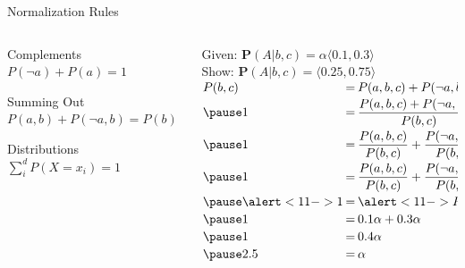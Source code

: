\documentclass[12pt]{beamer}
\begin{document}
\begin{frame}{Normalization Rules}
	\begin{columns}
		\begin{column}{2in}
			\begin{block}{Complements}
				$P(\lnot a) + P(a) = 1$
			\end{block}
			\begin{block}{Summing Out}
				$P(a, b) + P(\lnot a, b) = P(b)$
			\end{block}
			\begin{block}{Distributions}
				$\sum\limits^{d}_{i}{P(X=x_{i})} = 1$
			\end{block}
		\end{column}
		\pause
		\begin{column}{2.4in}
			\small
			Given: $\mathbf{P}(A|b,c) = \alpha\langle 0.1, 0.3 \rangle$
			\\ \smallskip
			Show: $\mathbf{P}(A|b,c) = \langle 0.25, 0.75 \rangle$
			\\ \bigskip
			\pause
			$
			\begin{array}{@{}l@{\hspace{.2em}}l@{\hspace{.2em}}l@{}}
			P(b,c) & = & P(a,b,c) + P(\lnot a,b,c) \\[.2em]
			\pause
			1      & = & \displaystyle\frac{P(a,b,c) + P(\lnot a,b,c)}{P(b, c)} \\[.8em]
			\pause
			1      & = & \displaystyle\frac{P(a,b,c)}{P(b, c)} + \frac{P(\lnot a,b,c)}{P(b, c)} \\[.8em]
			\pause
			1      & = & \displaystyle\frac{P(a,b,c)}{P(b, c)} + \frac{P(\lnot a,b,c)}{P(b, c)} \\[.8em]
			\pause
			\alert<11->{1} & = & \alert<11->{P(a|b,c) + P(\lnot a|b,c)} \\[.2em]
			\pause
			1      & = & 0.1\alpha + 0.3\alpha \\[.2em]
			\pause
			1      & = & 0.4\alpha \\[.2em]
			\pause
			2.5    & = & \alpha
			\end{array}
			$
		\end{column}
	\end{columns}
\end{frame}
\end{document}
